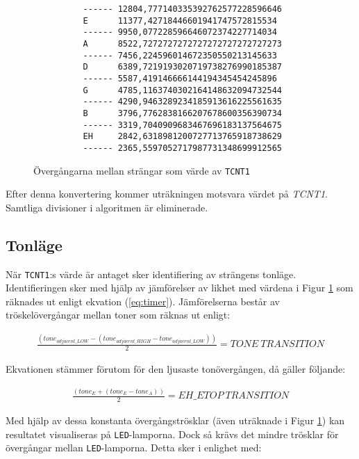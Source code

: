 \documentclass[a4paper]{article}
\begin{document}
\newpage


\begin{figure}[h]

\begin{verbatim}
          ------ 12804,777140335392762577228596646
          E      11377,42718446601941747572815534
          ------ 9950,077228596646072374227714034
          A      8522,7272727272727272727272727273
          ------ 7456,224596014672350550213145633
          D      6389,7219193020719738276990185387
          ------ 5587,419146666144194345454245896
          G      4785,1163740302164148632094732544
          ------ 4290,9463289234185913616225561635
          B      3796,7762838166207678600356390734
          ------ 3319,7040909683467696183137564675
          EH     2842,6318981200727713765918738629
          ------ 2365,5597052717987731348699912565			
\end{verbatim}

\caption{Övergångarna mellan strängar som värde av \texttt{TCNT1}}
\label{fig:timervärden}

\end{figure}

Efter denna konvertering kommer uträkningen motsvara värdet på \textit{TCNT1}. Samtliga divisioner i algoritmen är eliminerade.

\subsection{Tonläge}
När \texttt{TCNT1}:s värde är antaget sker identifiering av strängens tonläge. Identifieringen sker med hjälp av jämförelser av likhet med värdena i Figur \ref{fig:timervärden} som räknades ut enligt ekvation (\ref{eq:timer}). Jämförelserna består av tröskelövergångar mellan toner som räknas ut enligt:

\begin{eqnarray}
\frac{(tone_{adjacent\_LOW} - (tone_{adjacent\_HIGH} - tone_{adjacent\_LOW}))}{2} = TONE\ TRANSITION
\end{eqnarray}

Ekvationen stämmer förutom för den ljusaste tonövergången, då gäller följande:

\begin{eqnarray}
\frac{(tone_{E} + (tone_{E} - tone_{A}))}{2} = EH\_ETOP\ TRANSITION
\end{eqnarray}

Med hjälp av dessa konstanta övergångströsklar (även uträknade i Figur \ref{fig:timervärden}) kan resultatet visualiseras på \texttt{LED}-lamporna. Dock så krävs det mindre trösklar för övergångar mellan \texttt{LED}-lamporna. Detta sker i enlighet med:
\end{document}
